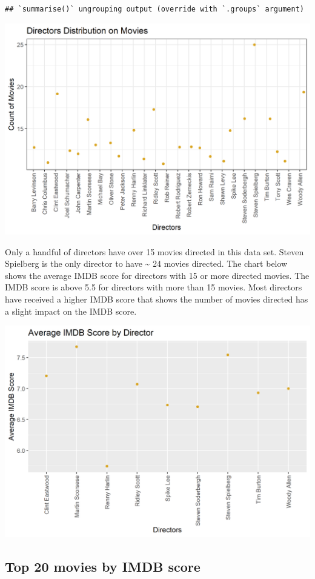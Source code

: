 \documentclass[
]{article}
\begin{document}
\begin{verbatim}
## `summarise()` ungrouping output (override with `.groups` argument)
\end{verbatim}

\includegraphics[width=0.75\linewidth]{IMDB_files/figure-latex/directors-1}

Only a handful of directors have over 15 movies directed in this data
set. Steven Spielberg is the only director to have \textasciitilde{} 24
movies directed. The chart below shows the average IMDB score for
directors with 15 or more directed movies. The IMDB score is above 5.5
for directors with more than 15 movies. Most directors have received a
higher IMDB score that shows the number of movies directed has a slight
impact on the IMDB score.

\includegraphics[width=0.75\linewidth]{IMDB_files/figure-latex/score by director-1}

\hypertarget{top-20-movies-by-imdb-score}{%
\subsection{Top 20 movies by IMDB
score}\label{top-20-movies-by-imdb-score}}
\end{document}
